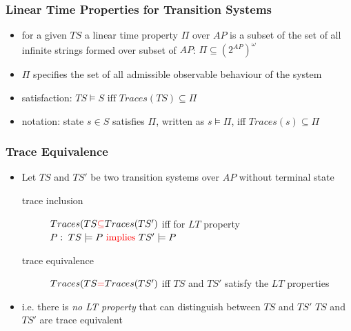 \documentclass[a4paper, 10pt]{article}
\begin{document}
\subsubsection*{Linear Time Properties for Transition Systems}
\begin{shaded}
    \begin{itemize}
        \item for a given $TS$ a linear time property $\Pi$ over $AP$ is a subset of the set of all infinite strings formed over subset of $AP$: $\Pi\subseteq(2^{AP})^\omega$
        \item $\Pi$ specifies the set of all admissible observable behaviour of the system
        \item satisfaction: $TS\models S \textrm{ iff } Traces(TS) \subseteq \Pi$
        \item notation: state $s\in S$ satisfies $\Pi$, written as $s\models \Pi$, iff $Traces(s)\subseteq\Pi$
    \end{itemize}
\end{shaded}

\subsubsection*{Trace Equivalence}
\begin{itemize}
    \item Let $TS$ and $TS'$ be two transition systems over $AP$ without terminal state
    \begin{description}
        \item[trace inclusion] $Traces(TS\textcolor{red}{\subseteq} Traces(TS')$ iff for  $LT$ property $P:\;TS\models P \textrm{ \textcolor{red}{implies} } TS'\models P$
        \item[trace equivalence] $Traces(TS\textcolor{red}{=} Traces(TS')$ iff $TS$ and $TS'$ satisfy the  $LT$ properties
    \end{description}
    \item i.e. there is \emph{no LT property} that can distinguish between $TS$ and $TS'$ \follows $TS$ and $TS'$ are trace equivalent
\end{itemize}
\end{document}
